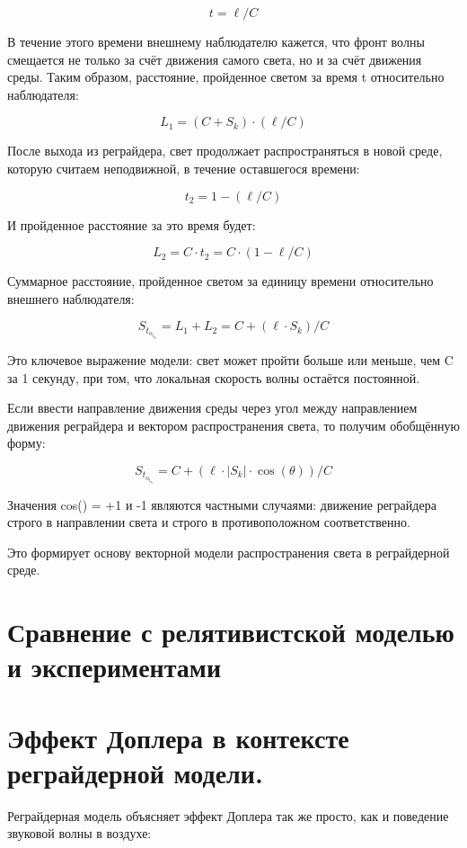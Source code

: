 \documentclass[12pt]{article}
\begin{document}
\[
t = \ell / C
\]

В течение этого времени внешнему наблюдателю кажется, что фронт волны смещается не только за счёт движения самого света, но и за счёт движения среды. Таким образом, расстояние, пройденное светом за время t относительно наблюдателя:

\[
L_1 = (C + S_k) \cdot (\ell / C)
\]

После выхода из реграйдера, свет продолжает распространяться в новой среде, которую считаем неподвижной, в течение оставшегося времени:

\[
t_2 = 1 - (\ell / C)
\]

И пройденное расстояние за это время будет:

\[
L_2 = C \cdot t_2 = C \cdot (1 - \ell / C)
\]

Суммарное расстояние, пройденное светом за единицу времени относительно внешнего наблюдателя:

\[
S_t_o_t_a_l = L_1 + L_2 = C + (\ell \cdot S_k) / C
\]

Это ключевое выражение модели: свет может пройти больше или меньше, чем C за 1 секунду, при том, что локальная скорость волны остаётся постоянной.
\par
Если ввести направление движения среды через угол \theta между направлением движения реграйдера и вектором распространения света, то получим обобщённую форму:

\[
S_t_o_t_a_l = C + (\ell \cdot \left|S_k\right| \cdot \cos(\theta)) / C
\]

Значения cos(\theta) = +1 и -1 являются частными случаями: движение реграйдера строго в направлении света и строго в противоположном соответственно.
\par
Это формирует основу векторной модели распространения света в реграйдерной среде.

\section*{Сравнение с релятивистской моделью и экспериментами}
\section*{Эффект Доплера в контексте реграйдерной модели.}


Реграйдерная модель объясняет эффект Доплера так же просто, как и поведение звуковой волны в воздухе:
\end{document}
